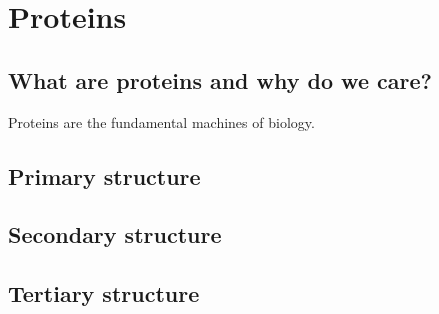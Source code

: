 \chapter{Proteins}
\section{What are proteins and why do we care?}
Proteins are the fundamental machines of biology.

\section{Primary structure}

\section{Secondary structure}

\section{Tertiary structure}


